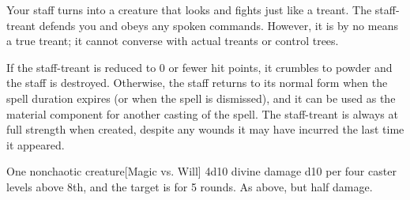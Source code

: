 \begin{spellheader}
    \spelldur{\durmed \dismissable}
\end{spellheader}
\begin{spelleffects}
    \spelleffect Your staff turns into a creature that looks and fights just like a treant. The staff-treant defends you and obeys any spoken commands. However, it is by no means a true treant; it cannot converse with actual treants or control trees.

    If the staff-treant is reduced to 0 or fewer hit points, it crumbles to powder and the staff is destroyed. Otherwise, the staff returns to its normal form when the spell duration expires (or when the spell is dismissed), and it can be used as the material component for another casting of the spell. The staff-treant is always at full strength when created, despite any wounds it may have incurred the last time it appeared.
\end{spelleffects}
\begin{spellfooter}
\end{spellfooter}

\begin{spellheader}
    \spellrng{\rngmed}
\end{spellheader}
\begin{spelleffects}
    \begin{spelltarget}{One nonchaotic creature}[Magic vs. Will]
        \spellsuccess 4d10 divine damage \add d10 per four caster levels above 8th, and the target is \bewildered for 5 rounds.
        \spellfailure As above, but half damage.
    \end{spelltarget}
\end{spelleffects}

